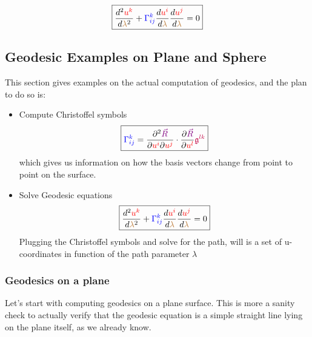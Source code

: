 \begin{equation}\label{eq:geodesic}
    \boxed{\frac{d^2 \begingroup\color{red}u^k\endgroup}{d\begingroup\color{brown}\lambda\endgroup^2} + \begingroup\color{blue}\Gamma^{k}_{ij}\endgroup \frac{d \begingroup\color{red}u^i\endgroup}{d\begingroup\color{brown}\lambda\endgroup} \frac{d \begingroup\color{red}u^j\endgroup}{d\begingroup\color{brown}\lambda\endgroup} = 0 }
\end{equation}

\subsection{Geodesic Examples on Plane and Sphere}

This section gives examples on the actual computation of geodesics, and the plan to do so is:

\begin{itemize}
    \item Compute Christoffel symbols
    \begin{equation}
    \boxed{\begingroup\color{blue}\Gamma^{k}_{ij}\endgroup = \frac{\partial^2 \begingroup\color{violet}\vec{R}\endgroup}{\partial \begingroup\color{red}u^i\endgroup \partial\begingroup\color{red}u^j\endgroup} \cdot \frac{\partial \begingroup\color{violet}\vec{R}\endgroup}{\partial \begingroup\color{red}u^l\endgroup} \begingroup\color{purple}\mathfrak{g}^{lk}\endgroup }
    \end{equation}
    which gives us information on how the basis vectors change from point to point on the surface.
    \item Solve Geodesic equations
    \begin{equation}
    \boxed{\frac{d^2 \begingroup\color{red}u^k\endgroup}{d\begingroup\color{brown}\lambda\endgroup^2} + \begingroup\color{blue}\Gamma^{k}_{ij}\endgroup \frac{d \begingroup\color{red}u^i\endgroup}{d\begingroup\color{brown}\lambda\endgroup} \frac{d \begingroup\color{red}u^j\endgroup}{d\begingroup\color{brown}\lambda\endgroup} = 0 }
    \end{equation}
    Plugging the Christoffel symbols and solve for the path, will is a set of u-coordinates in function of the path parameter $\lambda$  
\end{itemize}

\subsubsection{Geodesics on a plane}
Let's start with computing geodesics on a plane surface. This is more a sanity check to actually verify that the geodesic equation is a simple 
straight line lying on the plane itself, as we already know.\\

